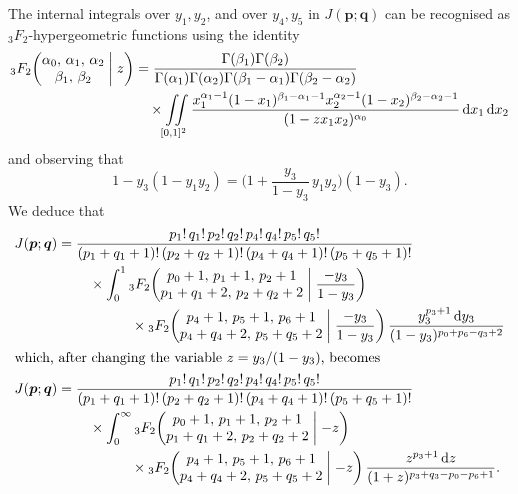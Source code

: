 \documentclass[12pt,reqno]{amsart}
\theoremstyle{remark}
\renewcommand{\d}{{\mathrm d}}
\newcommand\bp{\boldsymbol p}
\newcommand\bq{\boldsymbol q}
\begin{document}
The internal integrals over $y_1,y_2$,  and over $y_4,y_5$ in $J(\bp;\bq)$ can be recognised as $_3F_2$-hypergeometric functions using the identity 
\begin{align*}
{}_3F_2\bigg(\begin{matrix} \alpha_0, \, \alpha_1, \, \alpha_2 \\ \beta_1, \, \beta_2 \end{matrix}\biggm|z\bigg)
&=\frac{\Gamma(\beta_1)\Gamma(\beta_2)}{\Gamma(\alpha_1)\Gamma(\alpha_2)\Gamma(\beta_1-\alpha_1)\Gamma(\beta_2-\alpha_2)}
\\ &\quad\times
\iint\limits_{[0,1]^2}\frac{x_1^{\alpha_1-1}(1-x_1)^{\beta_1-\alpha_1-1}x_2^{\alpha_2-1}(1-x_2)^{\beta_2-\alpha_2-1}}
{(1-zx_1x_2)^{\alpha_0}}\,\d x_1\,\d x_2
\end{align*}
and observing that
\[
1-y_3(1-y_1y_2)=\bigg(1+\frac{y_3}{1-y_3}\,y_1y_2\bigg)(1-y_3).
\]
We deduce that
\begin{align}
J(\bp;\bq)
&=\frac{p_1!\,q_1!\,p_2!\,q_2!\,p_4!\,q_4!\,p_5!\,q_5!}{(p_1+q_1+1)!\,(p_2+q_2+1)!\,(p_4+q_4+1)!\,(p_5+q_5+1)!}
\nonumber\\ &\; \qquad  \times
\int_0^1
{}_3F_2\bigg( \begin{matrix} p_0+1, \, p_1+1, \, p_2+1 \\ p_1 + q_1 +2, \, p_2+q_2+2 \end{matrix}\biggm|\frac{-y_3}{1-y_3}\bigg)
\nonumber\\ &\;\quad \qquad \qquad \times
{}_3F_2\bigg( \begin{matrix} p_4+1, \, p_5+1, \, p_6+1 \\ p_4 + q_4 +2, \, p_5+q_5+2 \end{matrix}\biggm|\frac{-y_3}{1-y_3}\bigg)
\,\frac{y_3^{p_3+1}\,\d y_3}{(1-y_3)^{p_0+p_6-q_3+2}}
\nonumber\\ \intertext{which, after changing the variable $z=y_3/(1-y_3)$, becomes }
J(\bp;\bq)
&=\frac{p_1!\,q_1!\,p_2!\,q_2!\,p_4!\,q_4!\,p_5!\,q_5!}{(p_1+q_1+1)!\,(p_2+q_2+1)!\,(p_4+q_4+1)!\,(p_5+q_5+1)!}
\nonumber\\ &\; \qquad \times
\int_0^\infty
{}_3F_2\bigg( \begin{matrix} p_0+1, \, p_1+1, \, p_2+1 \\ p_1 + q_1 +2, \, p_2+q_2+2 \end{matrix}\biggm|-z\bigg)
\nonumber\\ &\;\quad \qquad  \qquad \times
{}_3F_2\bigg( \begin{matrix} p_4+1, \, p_5+1, \, p_6+1 \\ p_4 + q_4 +2, \, p_5+q_5+2 \end{matrix}\biggm|-z\bigg)
\,\frac{z^{p_3+1}\,\d z}{(1+z)^{p_3+q_3-p_0-p_6+1}}.
\label{3F2J}
\end{align}
\end{document}
